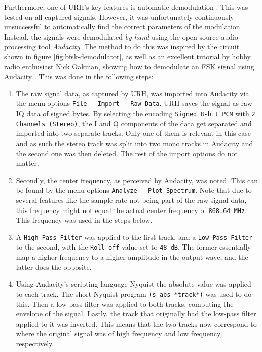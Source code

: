 Furthermore, one of \gls{URH}'s key features is automatic demodulation \cite{urh}. This was tested on all captured signals. However, it was unfortunately continuously unsuccessful to automatically find the correct parameters of the modulation. Instead, the signals were demodulated \textit{by hand} using the open-source audio processing tool \textit{Audacity}. The method to do this was inspired by the circuit shown in figure \ref{fig:bfsk-demodulator}, as well as an excellent tutorial by hobby radio enthusiast Nick Oakman, showing how to demodulate an FSK signal using Audacity \cite{oakman-fsk}. This was done in the following steps:
\begin{enumerate}
    \item The raw signal data, as captured by URH, was imported into Audacity via the menu options \texttt{File - Import - Raw Data}. URH saves the signal as raw IQ data of signed bytes. By selecting the encoding \texttt{Signed 8-bit PCM} with \texttt{2 Channels (Stereo)}, the I and Q components of the data get separated and imported into two separate tracks. Only one of them is relevant in this case and as such the stereo track was split into two mono tracks in Audacity and the second one was then deleted. The rest of the import options do not matter.

    \item Secondly, the center frequency, as perceived by Audacity, was noted. This can be found by the menu options \texttt{Analyze - Plot Spectrum}. Note that due to several features like the sample rate not being part of the raw signal data, this frequency might not equal the actual center frequency of \texttt{868.64 MHz}. This frequency was used in the steps below.

    \item A \texttt{High-Pass Filter} was applied to the first track, and a \texttt{Low-Pass Filter} to the second, with the \texttt{Roll-off} value set to \texttt{48 dB}. The former essentially map a higher frequency to a higher amplitude in the output wave, and the latter does the opposite.

    \item Using Audacity's scripting language Nyquist the absolute value was applied to each track. The short Nyquist program \texttt{(s-abs *track*)} was used to do this. Then a low-pass filter was applied to both tracks, computing the envelope of the signal. Lastly, the track that originally had the low-pass filter applied to it was inverted. This means that the two tracks now correspond to where the original signal was of high frequency and low frequency, respectively.


\end{enumerate}
